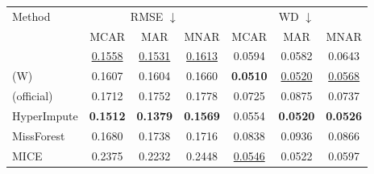 \begin{tabular}{lcccccc}
\toprule
Method & \multicolumn{3}{c}{RMSE $\downarrow$} & \multicolumn{3}{c}{WD $\downarrow$}\\
 & MCAR & MAR & MNAR & MCAR & MAR & MNAR\\
\midrule
\rmpp{} & \underline{0.1558} & \underline{0.1531} & \underline{0.1613} & 0.0594 & 0.0582 & 0.0643\\
\rmpp{} (W) & 0.1607 & 0.1604 & 0.1660 & \textbf{0.0510} & \underline{0.0520} & \underline{0.0568}\\
\remasker{} (official) & 0.1712 & 0.1752 & 0.1778 & 0.0725 & 0.0875 & 0.0737\\
\midrule
HyperImpute & \textbf{0.1512} & \textbf{0.1379} & \textbf{0.1569} & 0.0554 & \textbf{0.0520} & \textbf{0.0526}\\
MissForest & 0.1680 & 0.1738 & 0.1716 & 0.0838 & 0.0936 & 0.0866\\
MICE & 0.2375 & 0.2232 & 0.2448 & \underline{0.0546} & 0.0522 & 0.0597\\
\bottomrule
\end{tabular}
